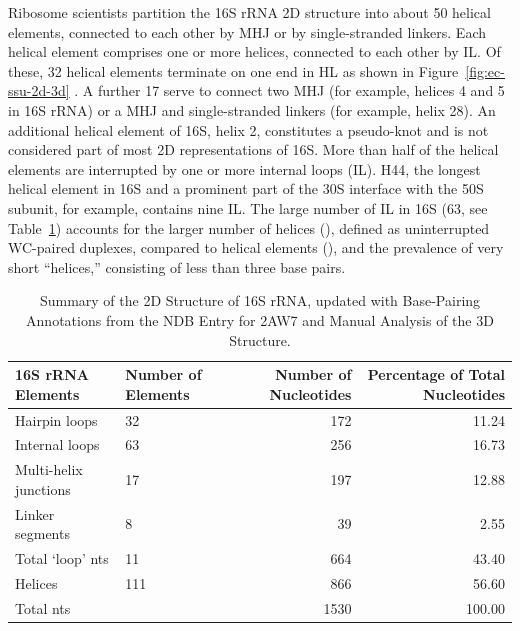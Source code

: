 Ribosome scientists partition the 16S rRNA 2D structure into about 50 helical
elements, connected to each other by MHJ or by single-stranded linkers. Each
helical element comprises one or more helices, connected to each other by IL. Of
these, 32 helical elements terminate on one end in HL as shown in
Figure~\ref{fig:ec-ssu-2d-3d} \cite{Petrov2013a,Yusupov2001}. A further 17 serve to
connect two MHJ (for example, helices 4 and 5 in 16S rRNA) or a MHJ and
single-stranded linkers (for example, helix 28). An additional helical element
of 16S, helix 2, constitutes a pseudo-knot and is not considered part of most 2D
representations of 16S. More than half of the helical elements are interrupted
by one or more internal loops (IL). H44, the longest helical element in 16S and
a prominent part of the 30S interface with the 50S subunit, for example,
contains nine IL. The large number of IL in \EC{} 16S (63, see
Table~\ref{tab:ec-element-count}) accounts for the larger number of helices
(), defined as uninterrupted WC-paired duplexes, compared to helical
elements (), and the prevalence of very short ``helices,'' consisting of
less than three base pairs. 

\begin{table}[ht]
  \begin{tabular}{llrr}
    \toprule
    16S rRNA Elements     & Number of Elements & Number of Nucleotides  & Percentage of Total Nucleotides \\
    \midrule
    Hairpin loops         & 32                 & 172                    & 11.24 \\
    Internal loops        & 63                 & 256                    & 16.73 \\
    Multi-helix junctions & 17                 & 197                    & 12.88 \\
    Linker segments       & 8                  & 39                     & 2.55 \\
    Total ‘loop’ nts      & 11                 & 664                    & 43.40 \\
    Helices               & 111                & 866                    & 56.60 \\
    Total nts             &                    & 1530                   & 100.00 \\
    \bottomrule
  \end{tabular}
  \caption{Summary of the 2D Structure of \EC{} 16S rRNA,
    updated with Base-Pairing Annotations from the NDB Entry for 2AW7 and Manual
  Analysis of the 3D Structure.}
  \label{tab:ec-element-count}
\end{table}

